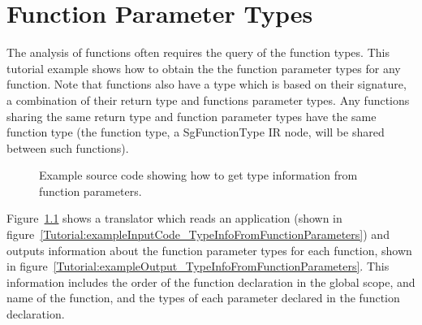 \chapter{Function Parameter Types}

   The analysis of functions often requires the query of the
function types.  This tutorial example shows how to obtain the
the function parameter types for any function.  Note that functions
also have a type which is based on their signature, a combination
of their return type and functions parameter types.  Any functions 
sharing the same return type and function parameter types have the 
same function type (the function type, a SgFunctionType IR node, 
will be shared between such functions).

\begin{figure}[!h]
{\indent
{\mySmallFontSize


\begin{latexonly}
   
\end{latexonly}

\begin{htmlonly}
   
\end{htmlonly}

}
}
\caption{Example source code showing how to get type information from function parameters.}
\label{Tutorial:exampleTypeInfoFromFunctionParameters}
\end{figure}

   Figure~\ref{Tutorial:exampleTypeInfoFromFunctionParameters} shows a translator which
reads an application (shown in
figure~\ref{Tutorial:exampleInputCode_TypeInfoFromFunctionParameters}) 
and outputs information about the function parameter types for each function,
shown in figure~\ref{Tutorial:exampleOutput_TypeInfoFromFunctionParameters}.
This information includes the order of the function declaration in the global
scope, and name of the function, and the types of each parameter declared in 
the function declaration.


